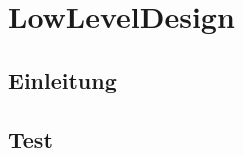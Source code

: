 \documentclass{scrbook}
\begin{document}
\frontmatter
\maketitle
\tableofcontents
\mainmatter


\part{LowLevelDesign}
\chapter*{Einleitung}

\chapter{Test}
 
\end{document}
